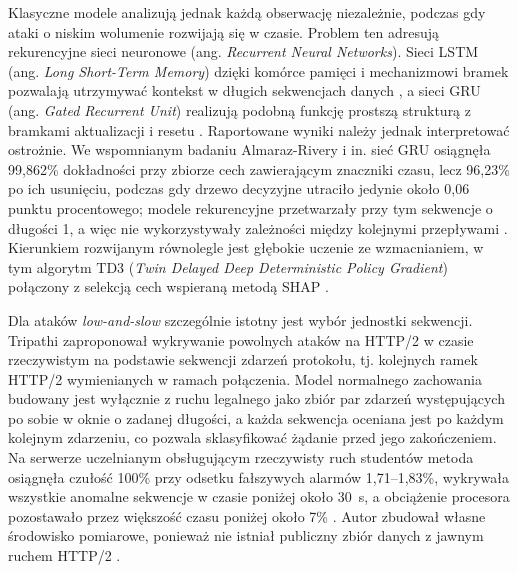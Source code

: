 \documentclass[a4paper,12pt]{article}
\begin{document}
Klasyczne modele analizują jednak każdą obserwację niezależnie, podczas gdy ataki o niskim wolumenie rozwijają się w czasie. Problem ten adresują rekurencyjne sieci neuronowe (ang. \textit{Recurrent Neural Networks}). Sieci LSTM (ang. \textit{Long Short-Term Memory}) dzięki komórce pamięci i mechanizmowi bramek pozwalają utrzymywać kontekst w długich sekwencjach danych \cite{hochreiter1997long}, a sieci GRU (ang. \textit{Gated Recurrent Unit}) realizują podobną funkcję prostszą strukturą z bramkami aktualizacji i resetu \cite{cho2014learning}. Raportowane wyniki należy jednak interpretować ostrożnie. We wspomnianym badaniu Almaraz-Rivery i in. sieć GRU osiągnęła 99,862\% dokładności przy zbiorze cech zawierającym znaczniki czasu, lecz 96,23\% po ich usunięciu, podczas gdy drzewo decyzyjne utraciło jedynie około 0,06 punktu procentowego; modele rekurencyjne przetwarzały przy tym sekwencje o długości 1, a więc nie wykorzystywały zależności między kolejnymi przepływami \cite{almarazrivera2022transport}. Kierunkiem rozwijanym równolegle jest głębokie uczenie ze wzmacnianiem, w tym algorytm TD3 (\textit{Twin Delayed Deep Deterministic Policy Gradient}) połączony z selekcją cech wspieraną metodą SHAP \cite{satpathy2025cloud}.

Dla ataków \textit{low-and-slow} szczególnie istotny jest wybór jednostki sekwencji. Tripathi zaproponował wykrywanie powolnych ataków na HTTP/2 w czasie rzeczywistym na podstawie sekwencji zdarzeń protokołu, tj. kolejnych ramek HTTP/2 wymienianych w ramach połączenia. Model normalnego zachowania budowany jest wyłącznie z ruchu legalnego jako zbiór par zdarzeń występujących po sobie w oknie o zadanej długości, a każda sekwencja oceniana jest po każdym kolejnym zdarzeniu, co pozwala sklasyfikować żądanie przed jego zakończeniem. Na serwerze uczelnianym obsługującym rzeczywisty ruch studentów metoda osiągnęła czułość 100\% przy odsetku fałszywych alarmów 1,71--1,83\%, wykrywała wszystkie anomalne sekwencje w czasie poniżej około 30~s, a obciążenie procesora pozostawało przez większość czasu poniżej około 7\% \cite{tripathi2024delays}. Autor zbudował własne środowisko pomiarowe, ponieważ nie istniał publiczny zbiór danych z jawnym ruchem HTTP/2 \cite{tripathi2024delays}.
\end{document}
